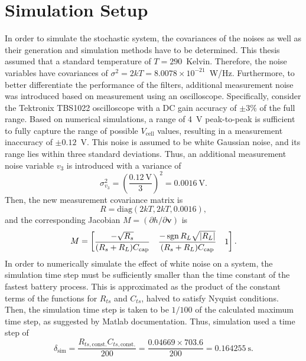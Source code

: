 \documentclass[../zhang_thesis.tex]{subfiles}
\begin{document}
\section{Simulation Setup}

In order to simulate the stochastic system, the covariances of the noises as well as their generation and simulation methods have to be determined. This thesis assumed that a standard temperature of $T=290$~Kelvin. Therefore, the noise variables have covariances of $\sigma^2=2kT=8.0078\times 10^{-21}$~W/Hz. Furthermore, to better differentiate the performance of the filters, additional measurement noise was introduced based on measurement using an oscilloscope. Specifically, consider the Tektronix TBS1022 oscilloscope with a DC gain accuracy of $\pm 3\%$ of the full range. Based on numerical simulations, a range of 4~V peak-to-peak
is sufficient to fully capture the range of possible $V_\text{cell}$ values, resulting in a measurement inaccuracy of $\pm 0.12$~V. This noise is assumed to be white Gaussian noise, and its range lies within three standard deviations. Thus, an additional measurement noise variable $v_3$ is introduced with a variance of
\begin{equation}
    \sigma_{v_3}^2 = \left( \frac{0.12~\text{V}}{3} \right)^2 = 0.0016~\text{V}.
\end{equation}
Then, the new measurement covariance matrix is
\begin{equation}
    R = \mathrm{diag}(2kT,2kT,0.0016),
\end{equation}
and the corresponding Jacobian $M=(\partial h/\partial\mathbf{v})$ is
\begin{equation}
    M = \begin{bmatrix}
         \dfrac{-\sqrt{R_s}}{(R_s+R_L)C_\text{cap}} & \dfrac{-\operatorname{sgn}{R_L}\sqrt{|R_L|}}{(R_s+R_L)C_\text{cap}} & 1
        \end{bmatrix} .
\end{equation}
In order to numerically simulate the effect of white noise on a system, the simulation time step must be sufficiently smaller than the time constant of the fastest battery process. This is approximated as the product of the constant terms of the functions for $R_{ts}$ and $C_{ts}$, halved to satisfy Nyquist conditions. Then, the simulation time step is taken to be $1/100$ of the calculated maximum time step, as suggested by Matlab documentation. Thus, simulation used a time step of
\begin{equation}
    \delta_\text{sim} = \frac{R_{ts,\text{const.}}C_{ts,\text{const.}}}{200} = \frac{0.04669\times 703.6}{200} = 0.164255~\text{s}.
\end{equation}
\end{document}
